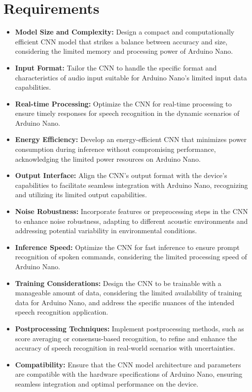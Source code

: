 \section{Requirements}

\begin{itemize}
	\item \textbf{Model Size and Complexity:} Design a compact and computationally efficient CNN model that strikes a balance between accuracy and size, considering the limited memory and processing power of Arduino Nano.
	
	\item \textbf{Input Format:} Tailor the CNN to handle the specific format and characteristics of audio input suitable for Arduino Nano's limited input data capabilities.
	
	\item \textbf{Real-time Processing:} Optimize the CNN for real-time processing to ensure timely responses for speech recognition in the dynamic scenarios of Arduino Nano.
	
	\item \textbf{Energy Efficiency:} Develop an energy-efficient CNN that minimizes power consumption during inference without compromising performance, acknowledging the limited power resources on Arduino Nano.
	
	\item \textbf{Output Interface:} Align the CNN's output format with the device's capabilities to facilitate seamless integration with Arduino Nano, recognizing and utilizing its limited output capabilities.
	
	\item \textbf{Noise Robustness:} Incorporate features or preprocessing steps in the CNN to enhance noise robustness, adapting to different acoustic environments and addressing potential variability in environmental conditions.
	
	\item \textbf{Inference Speed:} Optimize the CNN for fast inference to ensure prompt recognition of spoken commands, considering the limited processing speed of Arduino Nano.
	
	\item \textbf{Training Considerations:} Design the CNN to be trainable with a manageable amount of data, considering the limited availability of training data for Arduino Nano, and address the specific nuances of the intended speech recognition application.
	
	\item \textbf{Postprocessing Techniques:} Implement postprocessing methods, such as score averaging or consensus-based recognition, to refine and enhance the accuracy of speech recognition in real-world scenarios with uncertainties.
	
	\item \textbf{Compatibility:} Ensure that the CNN model architecture and parameters are compatible with the hardware specifications of Arduino Nano, ensuring seamless integration and optimal performance on the device.
\end{itemize}


